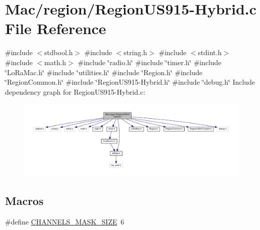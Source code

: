 \hypertarget{RegionUS915-Hybrid_8c}{}\section{Mac/region/\+Region\+U\+S915-\/\+Hybrid.c File Reference}
\label{RegionUS915-Hybrid_8c}
{\ttfamily \#include $<$stdbool.\+h$>$}\newline
{\ttfamily \#include $<$string.\+h$>$}\newline
{\ttfamily \#include $<$stdint.\+h$>$}\newline
{\ttfamily \#include $<$math.\+h$>$}\newline
{\ttfamily \#include \char`\"{}radio.\+h\char`\"{}}\newline
{\ttfamily \#include \char`\"{}timer.\+h\char`\"{}}\newline
{\ttfamily \#include \char`\"{}Lo\+Ra\+Mac.\+h\char`\"{}}\newline
{\ttfamily \#include \char`\"{}utilities.\+h\char`\"{}}\newline
{\ttfamily \#include \char`\"{}Region.\+h\char`\"{}}\newline
{\ttfamily \#include \char`\"{}Region\+Common.\+h\char`\"{}}\newline
{\ttfamily \#include \char`\"{}Region\+U\+S915-\/\+Hybrid.\+h\char`\"{}}\newline
{\ttfamily \#include \char`\"{}debug.\+h\char`\"{}}\newline
Include dependency graph for Region\+U\+S915-\/\+Hybrid.c\+:
\nopagebreak
\begin{figure}[H]
\begin{center}
\leavevmode
\includegraphics[width=350pt]{RegionUS915-Hybrid_8c__incl}
\end{center}
\end{figure}
\subsection*{Macros}
\begin{DoxyCompactItemize}
\item 
\#define \hyperlink{RegionUS915-Hybrid_8c_a1b20a8de3ae59c0b063fb313f0c70890}{C\+H\+A\+N\+N\+E\+L\+S\+\_\+\+M\+A\+S\+K\+\_\+\+S\+I\+ZE}~6
\end{DoxyCompactItemize}
